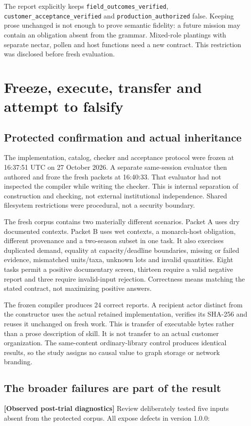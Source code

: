 \documentclass[11pt]{article}
\newcommand{\evidence}[1]{\textbf{[#1]}}
\begin{document}
The report explicitly keeps \texttt{field\_outcomes\_verified}, \texttt{customer\_acceptance\_verified} and \texttt{production\_authorized} false. Keeping prose unchanged is not enough to prove semantic fidelity: a future mission may contain an obligation absent from the grammar. Mixed-role plantings with separate nectar, pollen and host functions need a new contract. This restriction was disclosed before fresh evaluation.

\section{Freeze, execute, transfer and attempt to falsify}
\subsection{Protected confirmation and actual inheritance}
The implementation, catalog, checker and acceptance protocol were frozen at 16:37:51 UTC on 27 October 2026. A separate same-session evaluator then authored and froze the fresh packets at 16:40:33. That evaluator had not inspected the compiler while writing the checker. This is internal separation of construction and checking, not external institutional independence. Shared filesystem restrictions were procedural, not a security boundary.

The fresh corpus contains two materially different scenarios. Packet A uses dry documented contexts. Packet B uses wet contexts, a monarch-host obligation, different provenance and a two-season subset in one task. It also exercises duplicated demand, equality at capacity/deadline boundaries, missing or failed evidence, mismatched units/taxa, unknown lots and invalid quantities. Eight tasks permit a positive documentary screen, thirteen require a valid negative report and three require invalid-input rejection. Correctness means matching the stated contract, not maximizing positive answers.

The frozen compiler produces 24 correct reports. A recipient actor distinct from the constructor uses the actual retained implementation, verifies its SHA-256 and reuses it unchanged on fresh work. This is transfer of executable bytes rather than a prose description of skill. It is not transfer to an actual customer organization. The same-content ordinary-library control produces identical results, so the study assigns no causal value to graph storage or network branding.

\subsection{The broader failures are part of the result}
\evidence{Observed post-trial diagnostics} Review deliberately tested five inputs absent from the protected corpus. All expose defects in version 1.0.0:
\end{document}
